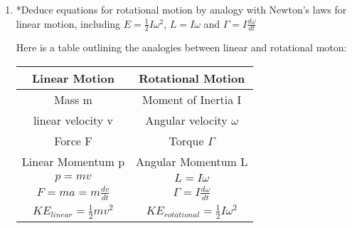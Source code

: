 \documentclass{article}
\begin{document}
\begin {enumerate}
Hence $I_{ring}= (2\pi x t \rho\delta x )x^2 = 2\pi \rho x^{3} \delta x$
\\

To find the moment of inertia of the disk, we sum all the rings and let their size $\delta x$ tend to 0.


$I_{disk}= \Sigma 2\pi \rho x^{3} \delta x$
\\

$I_{disk}= \int\displaylimits_0^r 2\pi \rho  t x^{3}\delta x $ 
\\

giving
\\

$I_{disk} = \frac{2\pi\rho t r^4}{4}$
\\

which is equal to

$I_{disk} = \frac{mr^2}{2}$
\\

Other objects would be derived in a similar way. You should get $I=\frac{mr^2}{3}$ for a rod rotating about one end, and $I =\frac{mr^2}{12}$ for a rod rotating about its centre of mass.
\\

\item  *Deduce equations for rotational motion by analogy with Newton’s laws for linear motion, including
$E =\frac{1}{2}I\omega ^2$, $ L = I\omega$ and $\Gamma=I \frac{d\omega}{dt}$

Here is a table outlining the analogies between linear and rotational moton:
\\

\begin{center}
	\begin{tabular}{||c c||} 
		\hline
		\bf Linear Motion & \bf Rotational Motion\\ [0.5ex]
		\hline\hline
		 Mass m &Moment of Inertia I\\ 
		\hline
		linear velocity v &Angular velocity $\omega$\\ 
		\hline
		Force F & Torque $\Gamma$ \\
		\hline
		Linear Momentum p  & Angular Momentum L \\
		\hline
		$p=mv$ & $ L = I\omega$  \\
		\hline
		$F=ma =m\frac{dv}{dt}$ & $\Gamma=I \frac{d\omega}{dt}$ \\ 
		\hline
		$KE_{linear}=\frac{1}{2}mv^2$ & $KE_{rotational} =\frac{1}{2}I\omega ^2$\\ [1ex] 
		\hline
	\end{tabular}
\end{center}




\end{enumerate}
\end{document}
